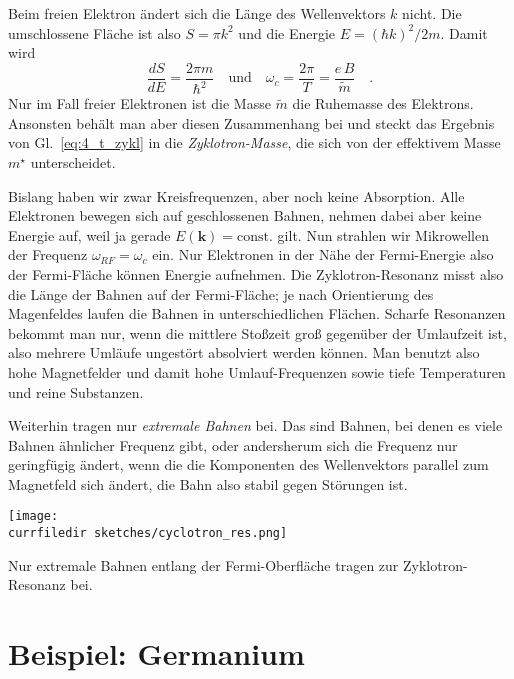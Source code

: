 Beim freien Elektron ändert sich die Länge des Wellenvektors $k$ nicht. Die umschlossene Fläche ist also $S = \pi k^2$ und die Energie $E = (\hbar k)^2 / 2m$. Damit wird 
\begin{equation}
   \frac{dS}{dE} = \frac{2 \pi m}{\hbar^2} \quad \text{und} \quad  \omega_c = \frac{2\pi}{T} =  \frac{e \, B }{\tilde{m}}  \quad .
 \end{equation}
Nur im Fall freier Elektronen ist die Masse $\tilde{m}$ die Ruhemasse des Elektrons. Ansonsten behält man aber diesen Zusammenhang bei und steckt das Ergebnis von Gl.~\ref{eq:4_t_zykl} in die 
 \emph{Zyklotron-Masse}, die sich von der effektivem Masse $m^\star$ unterscheidet.

Bislang haben wir zwar Kreisfrequenzen, aber noch keine Absorption. Alle Elektronen bewegen sich auf geschlossenen Bahnen, nehmen dabei aber keine Energie auf, weil ja gerade $E (\mathbf{k}) = \text{const.}$ gilt. Nun strahlen wir Mikrowellen der Frequenz $\omega_{RF} = \omega_c$ ein. Nur Elektronen in der Nähe der Fermi-Energie also der Fermi-Fläche können Energie aufnehmen. Die Zyklotron-Resonanz misst also die Länge der Bahnen auf der Fermi-Fläche; je nach Orientierung des Magenfeldes laufen die Bahnen in unterschiedlichen Flächen. Scharfe Resonanzen bekommt man nur, wenn die mittlere Stoßzeit groß gegenüber der Umlaufzeit ist, also mehrere Umläufe ungestört absolviert werden können. Man benutzt also hohe Magnetfelder und damit hohe Umlauf-Frequenzen sowie tiefe Temperaturen und reine Substanzen.

Weiterhin tragen nur \emph{extremale Bahnen} bei. Das sind Bahnen, bei denen es viele Bahnen ähnlicher Frequenz gibt,
oder andersherum sich die Frequenz nur geringfügig ändert, wenn die die Komponenten des Wellenvektors parallel zum Magnetfeld sich ändert, die Bahn also stabil gegen Störungen ist. 

\begin{marginfigure}
   \texttt{[image: \\currfiledir sketches/cyclotron\_res.png]}
   \caption{Nur extremale Bahnen entlang der Fermi-Oberfläche tragen zur Zyklotron-Resonanz bei.}
\end{marginfigure}


\section{Beispiel: Germanium}


